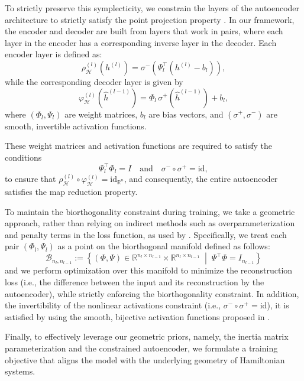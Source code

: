 \documentclass{article}
\theoremstyle{plain}
\theoremstyle{definition}
\theoremstyle{remark}
\begin{document}
To strictly preserve this symplecticity, we constrain the layers of the autoencoder architecture to strictly satisfy the point projection property \cite{otto2023}. In our framework, the encoder and decoder are built from layers that work in pairs, where each layer in the encoder has a corresponding inverse layer in the decoder. Each encoder layer is defined as:
\[
\rho_{\mathcal{H}}^{(l)}(h^{(l)}) = \sigma^{-}\left( \Psi_l^\top (h^{(l)} - b_l) \right),
\]
while the corresponding decoder layer is given by
\[
\varphi_{\mathcal{H}}^{(l)}(\hat{h}^{(l-1)}) = \Phi_l \, \sigma^{+}(\hat{h}^{(l-1)}) + b_l,
\]
where $(\Phi_l, \Psi_l)$ are weight matrices, $b_l$ are bias vectors, and $(\sigma^+, \sigma^-)$ are smooth, invertible activation functions.

These weight matrices and activation functions are required to satisfy the conditions
\[
\Psi_l^\top \Phi_l = I \quad \text{and} \quad \sigma^- \circ \sigma^+ = \mathrm{id},
\]
to ensure that $\rho_{\mathcal{H}}^{(l)} \circ \varphi_{\mathcal{H}}^{(l)} = \mathrm{id}_{\mathbb{R}^n}$, and consequently, the entire autoencoder satisfies the map reduction property.

To maintain the biorthogonality constraint during training, we take a geometric approach, rather than relying on indirect methods such as overparameterization and penalty terms in the loss function, as used by \cite{otto2023}. Specifically, we treat each pair $(\Phi_l, \Psi_l)$ as a point on the biorthogonal manifold defined as follows:
\begin{equation*}
    \mathcal{B}_{n_l, n_{l-1}} := \left\{ (\Phi, \Psi) \in \mathbb{R}^{n_l \times n_{l-1}} \times \mathbb{R}^{n_l \times n_{l-1}} \;\middle|\; \Psi^\top \Phi = I_{n_{l-1}} \right\}
\end{equation*}
and we perform optimization over this manifold to minimize the reconstruction loss (i.e., the difference between the input and its reconstruction by the autoencoder), while strictly enforcing the biorthogonality constraint. In addition, the invertibility of the nonlinear activations constraint (i.e., $\sigma^- \circ \sigma^+ = \mathrm{id}$), it is satisfied by using the smooth, bijective activation functions proposed in \cite[Equation 12]{otto2023}.

Finally, to effectively leverage our geometric priors, namely, the inertia matrix parameterization and the constrained autoencoder, we formulate a training objective that aligns the model with the underlying geometry of Hamiltonian systems.
\end{document}
